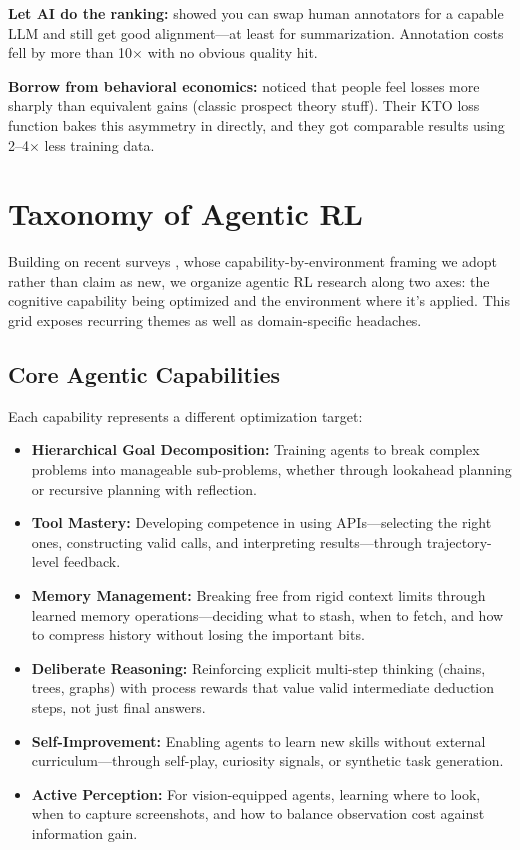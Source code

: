 \documentclass[12pt,a4paper]{report}
\theoremstyle{definition}
\begin{document}
\textbf{Let AI do the ranking:} \citet{lee2023rlaif} showed you can swap human annotators for a capable LLM and still get good alignment---at least for summarization. Annotation costs fell by more than 10$\times$ with no obvious quality hit.

\textbf{Borrow from behavioral economics:} \citet{ethayarajh2024kto} noticed that people feel losses more sharply than equivalent gains (classic prospect theory stuff). Their KTO loss function bakes this asymmetry in directly, and they got comparable results using 2--4$\times$ less training data.

\section{Taxonomy of Agentic RL}
\label{sec:taxonomy}

Building on recent surveys \cite{wang2025landscape}, whose capability-by-environment framing we adopt rather than claim as new, we organize agentic RL research along two axes: the cognitive capability being optimized and the environment where it's applied. This grid exposes recurring themes as well as domain-specific headaches.

\subsection{Core Agentic Capabilities}
Each capability represents a different optimization target:
\begin{itemize}
    \item \textbf{Hierarchical Goal Decomposition:} Training agents to break complex problems into manageable sub-problems, whether through lookahead planning or recursive planning with reflection.
    \item \textbf{Tool Mastery:} Developing competence in using APIs---selecting the right ones, constructing valid calls, and interpreting results---through trajectory-level feedback.
    \item \textbf{Memory Management:} Breaking free from rigid context limits through learned memory operations---deciding what to stash, when to fetch, and how to compress history without losing the important bits.
    \item \textbf{Deliberate Reasoning:} Reinforcing explicit multi-step thinking (chains, trees, graphs) with process rewards that value valid intermediate deduction steps, not just final answers.
    \item \textbf{Self-Improvement:} Enabling agents to learn new skills without external curriculum---through self-play, curiosity signals, or synthetic task generation.
    \item \textbf{Active Perception:} For vision-equipped agents, learning where to look, when to capture screenshots, and how to balance observation cost against information gain.
\end{itemize}
\end{document}
